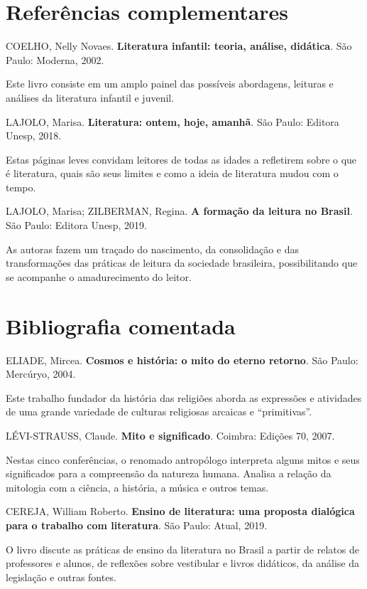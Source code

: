 \documentclass[12pt]{extarticle}
\begin{document}
\section{Referências complementares}

COELHO, Nelly Novaes. \textbf{Literatura infantil: teoria, análise,
didática}. São Paulo: Moderna, 2002.

Este livro consiste em um amplo painel das possíveis abordagens,
leituras e análises da literatura infantil e juvenil.

LAJOLO, Marisa. \textbf{Literatura: ontem, hoje, amanhã}. São Paulo:
Editora Unesp, 2018.

Estas páginas leves convidam leitores de todas as idades a refletirem
sobre o que é literatura, quais são seus limites e como a ideia de
literatura mudou com o tempo.

LAJOLO, Marisa; ZILBERMAN, Regina. \textbf{A formação da leitura no
Brasil}. São Paulo: Editora Unesp, 2019.

As autoras fazem um traçado do nascimento, da consolidação e das
transformações das práticas de leitura da sociedade brasileira,
possibilitando que se acompanhe o amadurecimento do leitor.

\section{Bibliografia comentada}

ELIADE, Mircea. \textbf{Cosmos e história: o mito do eterno retorno}.
São Paulo: Mercúryo, 2004.

Este trabalho fundador da história das religiões aborda as expressões e
atividades de uma grande variedade de culturas religiosas arcaicas e
``primitivas''.

LÉVI-STRAUSS, Claude. \textbf{Mito e significado}. Coimbra: Edições 70,
2007.

Nestas cinco conferências, o renomado antropólogo interpreta alguns
mitos e seus significados para a compreensão da natureza humana. Analisa
a relação da mitologia com a ciência, a história, a música e outros
temas.

CEREJA, William Roberto. \textbf{Ensino de literatura: uma proposta
dialógica para o trabalho com literatura}. São Paulo: Atual, 2019.

O livro discute as práticas de ensino da literatura no Brasil a partir
de relatos de professores e alunos, de reflexões sobre vestibular e
livros didáticos, da análise da legislação e outras fontes.
\end{document}
